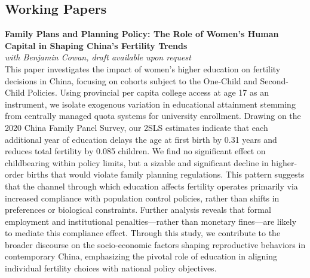\documentclass[11pt,letterpaper]{article}
\begin{document}
\subsection{Working Papers}

\textbf{Family Plans and Planning Policy: The Role of Women's Human Capital in Shaping China's Fertility Trends} \\
\textit{with Benjamin Cowan, draft available upon request} \\[4pt]
This paper investigates the impact of women's higher education on fertility decisions in China, focusing on cohorts subject to the One-Child and Second-Child Policies. Using provincial per capita college access at age 17 as an instrument, we isolate exogenous variation in educational attainment stemming from centrally managed quota systems for university enrollment. Drawing on the 2020 China Family Panel Survey, our 2SLS estimates indicate that each additional year of education delays the age at first birth by 0.31 years and reduces total fertility by 0.085 children. We find no significant effect on childbearing within policy limits, but a sizable and significant decline in higher-order births that would violate family planning regulations. This pattern suggests that the channel through which education affects fertility operates primarily via increased compliance with population control policies, rather than shifts in preferences or biological constraints. Further analysis reveals that formal employment and institutional penalties—rather than monetary fines—are likely to mediate this compliance effect. Through this study, we contribute to the broader discourse on the socio-economic factors shaping reproductive behaviors in contemporary China, emphasizing the pivotal role of education in aligning individual fertility choices with national policy objectives.
\end{document}
